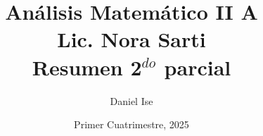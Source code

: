 \documentclass[11pt]{article}
\title{Análisis Matemático II A\\Lic. Nora Sarti\\Resumen 2\(^{do}\) parcial}
\author{Daniel Ise}
\date{Primer Cuatrimestre, 2025}
\begin{document}
\maketitle

\tableofcontents

\pagebreak



\end{document}
